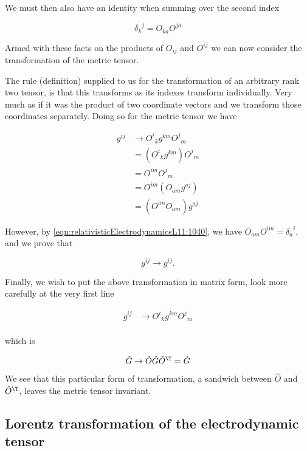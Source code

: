 We must then also have an identity when summing over the second index

\begin{equation}\label{eqn:relativisticElectrodynamicsL11:1040}
{\delta_{k}}^j = O_{k a} O^{j a} 
\end{equation}

Armed with these facts on the products of $O_{ij}$ and $O^{ij}$ we can now consider the transformation of the metric tensor.

The rule (definition) supplied to us for the transformation of an arbitrary rank two tensor, is that this transforms as its indexes transform individually.  Very much as if it was the product of two coordinate vectors and we transform those coordinates separately.  Doing so for the metric tensor we have

\begin{align*}
g^{ij} 
&\rightarrow {O^i}_k g^{km} {O^j}_m \\
&= ({O^i}_k g^{km}) {O^j}_m \\
&= O^{i m} {O^j}_m \\
&= O^{i m} (O_{a m} g^{a j}) \\
&= (O^{i m} O_{a m}) g^{a j}
\end{align*}

However, by \ref{eqn:relativisticElectrodynamicsL11:1040}, we have $O_{a m} O^{i m} = {\delta_a}^i$, and we prove that 

\begin{equation}\label{eqn:relativisticElectrodynamicsL11:960}
g^{ij} \rightarrow g^{ij}.
\end{equation}

Finally, we wish to put the above transformation in matrix form, look more carefully at the very first line

\begin{align*}
g^{ij}
&\rightarrow {O^i}_k g^{km} {O^j}_m \\
\end{align*}

which is

\begin{equation}\label{eqn:relativisticElectrodynamicsL11:n}
\hat{G} \rightarrow \hat{O} \hat{G} \hat{O}^\T = \hat{G}
\end{equation}

We see that this particular form of transformation, a sandwich between $\hat{O}$ and $\hat{O}^\T$, leaves the metric tensor invariant.  

\subsection{Lorentz transformation of the electrodynamic tensor}

